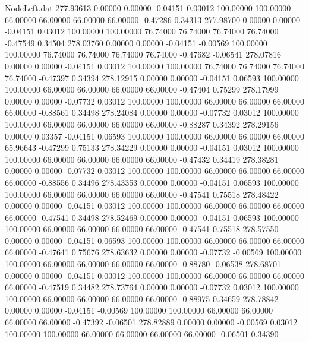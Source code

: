 \begin{filecontents}{NodeLeft.dat}
 277.93613    0.00000    0.00000    -0.04151    0.03012  100.00000  100.00000   66.00000   66.00000   66.00000   66.00000   -0.47286    0.34313
 277.98700    0.00000    0.00000    -0.04151    0.03012  100.00000  100.00000   76.74000   76.74000   76.74000   76.74000   -0.47549    0.34504
 278.03760    0.00000    0.00000    -0.04151   -0.00569  100.00000  100.00000   76.74000   76.74000   76.74000   76.74000   -0.47682   -0.06541
 278.07816    0.00000    0.00000    -0.04151    0.03012  100.00000  100.00000   76.74000   76.74000   76.74000   76.74000   -0.47397    0.34394
 278.12915    0.00000    0.00000    -0.04151    0.06593  100.00000  100.00000   66.00000   66.00000   66.00000   66.00000   -0.47404    0.75299
 278.17999    0.00000    0.00000    -0.07732    0.03012  100.00000  100.00000   66.00000   66.00000   66.00000   66.00000   -0.88561    0.34498
 278.24084    0.00000    0.00000    -0.07732    0.03012  100.00000  100.00000   66.00000   66.00000   66.00000   66.00000   -0.88287    0.34392
 278.29156    0.00000    0.03357    -0.04151    0.06593  100.00000  100.00000   66.00000   66.00000   66.00000   65.96643   -0.47299    0.75133
 278.34229    0.00000    0.00000    -0.04151    0.03012  100.00000  100.00000   66.00000   66.00000   66.00000   66.00000   -0.47432    0.34419
 278.38281    0.00000    0.00000    -0.07732    0.03012  100.00000  100.00000   66.00000   66.00000   66.00000   66.00000   -0.88556    0.34496
 278.43353    0.00000    0.00000    -0.04151    0.06593  100.00000  100.00000   66.00000   66.00000   66.00000   66.00000   -0.47541    0.75518
 278.48422    0.00000    0.00000    -0.04151    0.03012  100.00000  100.00000   66.00000   66.00000   66.00000   66.00000   -0.47541    0.34498
 278.52469    0.00000    0.00000    -0.04151    0.06593  100.00000  100.00000   66.00000   66.00000   66.00000   66.00000   -0.47541    0.75518
 278.57550    0.00000    0.00000    -0.04151    0.06593  100.00000  100.00000   66.00000   66.00000   66.00000   66.00000   -0.47641    0.75676
 278.63632    0.00000    0.00000    -0.07732   -0.00569  100.00000  100.00000   66.00000   66.00000   66.00000   66.00000   -0.88780   -0.06538
 278.68701    0.00000    0.00000    -0.04151    0.03012  100.00000  100.00000   66.00000   66.00000   66.00000   66.00000   -0.47519    0.34482
 278.73764    0.00000    0.00000    -0.07732    0.03012  100.00000  100.00000   66.00000   66.00000   66.00000   66.00000   -0.88975    0.34659
 278.78842    0.00000    0.00000    -0.04151   -0.00569  100.00000  100.00000   66.00000   66.00000   66.00000   66.00000   -0.47392   -0.06501
 278.82889    0.00000    0.00000    -0.00569    0.03012  100.00000  100.00000   66.00000   66.00000   66.00000   66.00000   -0.06501    0.34390

\end{filecontents}
